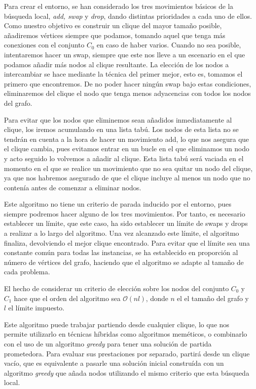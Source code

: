 Para crear el entorno, se han considerado los tres movimientos básicos de la búsqueda local,
\textit{add, swap} y \textit{drop}, dando distintas prioridades a cada uno de ellos. Como
nuestro objetivo es construir un clique del mayor tamaño posible, añadiremos vértices siempre
que podamos, tomando aquel que tenga más conexiones con el conjunto $C_0$ en caso de haber varios.
Cuando no sea posible, intentaremos hacer un swap, siempre que este nos lleve a un escenario
en el que podamos añadir más nodos al clique resultante. La elección de los nodos a intercambiar
se hace mediante la técnica del primer mejor, esto es, tomamos el primero que encontremos.
De no poder hacer ningún swap bajo estas condiciones, eliminaremos del clique el nodo que
tenga menos adyacencias con todos los nodos del grafo.

Para evitar que los nodos que eliminemos sean añadidos inmediatamente al clique, los iremos
acumulando en una lista tabú. Los nodos de esta lista no se tendrán en cuenta a la hora de
hacer un movimiento add, lo que nos asegura que el clique cambia, pues evitamos entrar en
un bucle en el que eliminamos un nodo y acto seguido lo volvemos a añadir al clique.
Esta lista tabú será vaciada en el momento en el que se realice un movimiento que no sea
quitar un nodo del clique, ya que nos habremos asegurado de que el clique incluye al menos
un nodo que no contenía antes de comenzar a eliminar nodos.

Este algoritmo no tiene un criterio de parada inducido por el entorno, pues siempre podremos
hacer alguno de los tres movimientos. Por tanto, es necesario establecer un límite, que este
caso, ha sido establecer un límite de swaps y drops a realizar a lo largo del algoritmo.
Una vez alcanzado este límite, el algoritmo finaliza, devolviendo el mejor clique encontrado.
Para evitar que el límite sea una constante común para todas las instancias, se ha establecido
en proporción al número de vértices del grafo, haciendo que el algoritmo se adapte al tamaño
de cada problema.

El hecho de considerar un criterio de elección sobre los nodos del conjunto $C_0$ y $C_1$ hace que
el orden del algoritmo sea $\mathcal{O}(nl)$, donde $n$ el el tamaño del grafo y $l$ el límite impuesto.

Este algoritmo puede trabajar partiendo desde cualquier clique, lo que nos permite utilizarlo en
técnicas híbridas como algoritmos meméticos, o combinarlo con el uso de un algoritmo \textit{greedy}
para tener una solución de partida prometedora. Para evaluar sus prestaciones por separado,
partirá desde un clique vacío, que es equivalente a pasarle una solución inicial construída
con un algoritmo \textit{greedy} que añada nodos utilizando el mismo criterio que esta búsqueda local.

